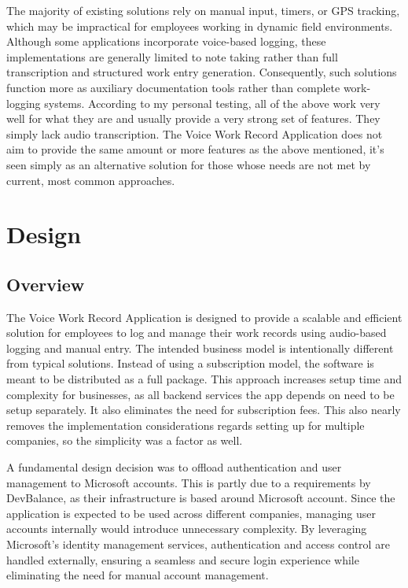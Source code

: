\documentclass[
  digital,     %
  oneside,     %
  nosansbold,  %
  nocolorbold, %
  lof,         %
  lot,         %
]{fithesis4}
\begin{document}
The majority of existing solutions rely on manual input, timers, or \gls{GPS} tracking, which may be impractical for employees working in dynamic field environments. Although some applications incorporate voice-based logging, these implementations are generally limited to note taking rather than full transcription and structured work entry generation. Consequently, such solutions function more as auxiliary documentation tools rather than complete work-logging systems. According to my personal testing, all of the above work very well for what they are and usually provide a very strong set of features. They simply lack audio transcription. The Voice Work Record Application does not aim to provide the same amount or more features as the above mentioned, it's seen simply as an alternative solution for those whose needs are not met by current, most common approaches.

\chapter{Design}

\section{Overview}

The Voice Work Record Application is designed to provide a scalable and efficient solution for employees to log and manage their work records using audio-based logging and manual entry. The intended business model is intentionally different from typical solutions. Instead of using a subscription model, the software is meant to be distributed as a full package. This approach increases setup time and complexity for businesses, as all backend services the app depends on need to be setup separately. It also eliminates the need for subscription fees. This also nearly removes the implementation considerations regards setting up for multiple companies, so the simplicity was a factor as well.

A fundamental design decision was to offload authentication and user management to Microsoft accounts. This is partly due to a requirements by DevBalance, as their infrastructure is based around Microsoft account. Since the application is expected to be used across different companies, managing user accounts internally would introduce unnecessary complexity. By leveraging Microsoft's identity management services, authentication and access control are handled externally, ensuring a seamless and secure login experience while eliminating the need for manual account management.
\end{document}
